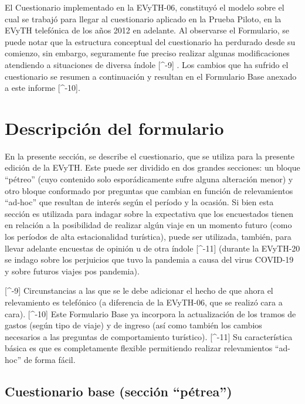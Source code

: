 \documentclass[
  openany]{book}
\begin{document}
El Cuestionario implementado en la EVyTH-06, constituyó el modelo sobre el cual se trabajó para llegar al cuestionario aplicado en la Prueba Piloto, en la EVyTH telefónica de los años 2012 en adelante.
Al observarse el Formulario, se puede notar que la estructura conceptual del cuestionario ha perdurado desde su comienzo, sin embargo, seguramente fue preciso realizar algunas modificaciones atendiendo a situaciones de diversa índole {[}\^{}-9{]} .
Los cambios que ha sufrido el cuestionario se resumen a continuación y resultan en el Formulario Base anexado a este informe {[}\^{}-10{]}.

\hypertarget{descripciuxf3n-del-formulario}{%
\section{Descripción del formulario}\label{descripciuxf3n-del-formulario}}

En la presente sección, se describe el cuestionario, que se utiliza para la presente edición de la EVyTH.
Este puede ser dividido en dos grandes secciones: un bloque ``pétreo'' (cuyo contenido solo esporádicamente sufre alguna alteración menor) y otro bloque conformado por preguntas que cambian en función de relevamientos ``ad-hoc'' que resultan de interés según el período y la ocasión.
Si bien esta sección es utilizada para indagar sobre la expectativa que los encuestados tienen en relación a la posibilidad de realizar algún viaje en un momento futuro (como los períodos de alta estacionalidad turística), puede ser utilizada, también, para llevar adelante encuestas de opinión u de otra índole {[}\^{}-11{]} (durante la EVyTH-20 se indago sobre los perjuicios que tuvo la pandemia a causa del virus COVID-19 y sobre futuros viajes pos pandemia).

{[}\^{}-9{]} Circunstancias a las que se le debe adicionar el hecho de que ahora el relevamiento es telefónico (a diferencia de la EVyTH-06, que se realizó cara a cara).
{[}\^{}-10{]} Este Formulario Base ya incorpora la actualización de los tramos de gastos (según tipo de viaje) y de ingreso (así como también los cambios necesarios a las preguntas de comportamiento turístico).
{[}\^{}-11{]} Su característica básica es que es completamente flexible permitiendo realizar relevamientos ``ad-hoc'' de forma fácil.

\hypertarget{cuestionario-base-secciuxf3n-puxe9trea}{%
\subsection{Cuestionario base (sección ``pétrea'')}\label{cuestionario-base-secciuxf3n-puxe9trea}}
\end{document}
